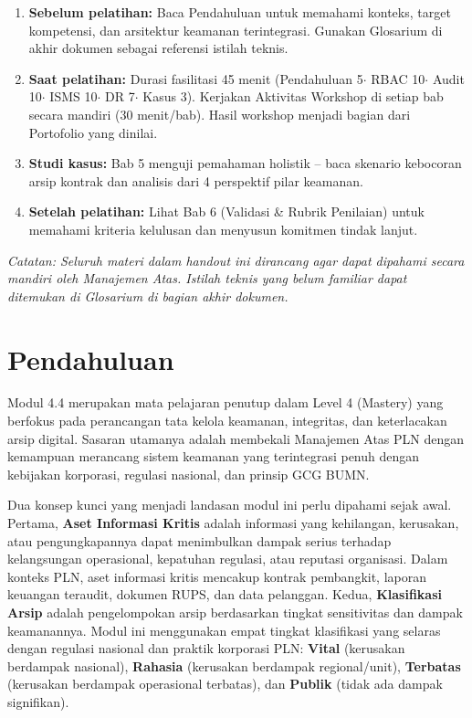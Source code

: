 \documentclass[12pt,a4paper]{report}
\begin{document}
\begin{plnbox}
\begin{enumerate}[leftmargin=*]
    \item \textbf{Sebelum pelatihan:} Baca Pendahuluan untuk memahami konteks, target kompetensi, dan arsitektur keamanan terintegrasi. Gunakan Glosarium di akhir dokumen sebagai referensi istilah teknis.
    \item \textbf{Saat pelatihan:} Durasi fasilitasi 45 menit (Pendahuluan 5$\cdot$ RBAC 10$\cdot$ Audit 10$\cdot$ ISMS 10$\cdot$ DR 7$\cdot$ Kasus 3). Kerjakan Aktivitas Workshop di setiap bab secara mandiri (30 menit/bab). Hasil workshop menjadi bagian dari Portofolio yang dinilai.
    \item \textbf{Studi kasus:} Bab 5 menguji pemahaman holistik -- baca skenario kebocoran arsip kontrak dan analisis dari 4 perspektif pilar keamanan.
    \item \textbf{Setelah pelatihan:} Lihat Bab 6 (Validasi \& Rubrik Penilaian) untuk memahami kriteria kelulusan dan menyusun komitmen tindak lanjut.
\end{enumerate}
\end{plnbox}

\vspace{0.5cm}
\noindent\small\textit{Catatan: Seluruh materi dalam handout ini dirancang agar dapat dipahami secara mandiri oleh Manajemen Atas. Istilah teknis yang belum familiar dapat ditemukan di Glosarium di bagian akhir dokumen.}

\tableofcontents

\chapter*{Pendahuluan}
\setcounter{section}{0}
\renewcommand{\thesection}{\Alph{section}}
Modul 4.4 merupakan mata pelajaran penutup dalam Level 4 (Mastery) yang berfokus pada perancangan tata kelola keamanan, integritas, dan keterlacakan arsip digital. Sasaran utamanya adalah membekali Manajemen Atas PLN dengan kemampuan merancang sistem keamanan yang terintegrasi penuh dengan kebijakan korporasi, regulasi nasional, dan prinsip GCG BUMN.

Dua konsep kunci yang menjadi landasan modul ini perlu dipahami sejak awal. Pertama, \textbf{Aset Informasi Kritis} adalah informasi yang kehilangan, kerusakan, atau pengungkapannya dapat menimbulkan dampak serius terhadap kelangsungan operasional, kepatuhan regulasi, atau reputasi organisasi. Dalam konteks PLN, aset informasi kritis mencakup kontrak pembangkit, laporan keuangan teraudit, dokumen RUPS, dan data pelanggan. Kedua, \textbf{Klasifikasi Arsip} adalah pengelompokan arsip berdasarkan tingkat sensitivitas dan dampak keamanannya. Modul ini menggunakan empat tingkat klasifikasi yang selaras dengan regulasi nasional dan praktik korporasi PLN: \textbf{Vital} (kerusakan berdampak nasional), \textbf{Rahasia} (kerusakan berdampak regional/unit), \textbf{Terbatas} (kerusakan berdampak operasional terbatas), dan \textbf{Publik} (tidak ada dampak signifikan).
\end{document}
